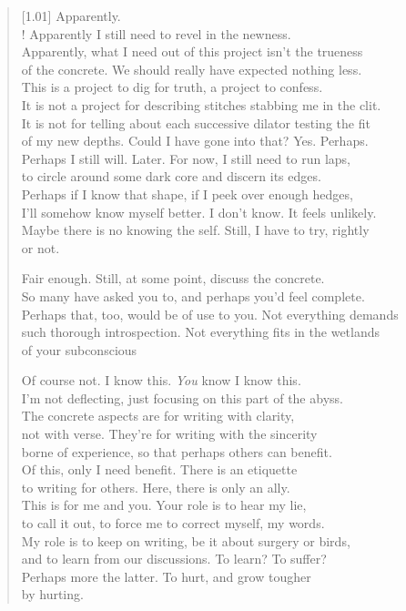 \begin{verse}[1.01\textwidth]
  Apparently.\\!
   Apparently I still need to revel in the newness.\\
  Apparently, what I need out of this project isn't the trueness\\
  of the concrete. We should really have expected nothing less.\\
  This is a project to dig for truth, a project to confess.\\
  It is not a project for describing stitches stabbing me in the clit.\\
  It is not for telling about each successive dilator testing the fit\\
  of my new depths. Could I have gone into that? Yes. Perhaps.\\
  Perhaps I still will. Later. For now, I still need to run laps,\\
  to circle around some dark core and discern its edges.\\
  Perhaps if I know that shape, if I peek over enough hedges,\\
  I'll somehow know myself better. I don't know. It feels unlikely.\\
  Maybe there is no knowing the self. Still, I have to try, rightly\\
  or not.

  \begin{ally}
    \noindent Fair enough. Still, at some point, discuss the concrete.\\
  \noindent So many have asked you to, and perhaps you'd feel complete.\\
  \noindent Perhaps that, too, would be of use to you. Not everything demands\\
  \noindent such thorough introspection. Not everything fits in the wetlands\\
  \noindent of your subconscious
\end{ally}

  Of course not. I know this. \emph{You} know I know this.\\
  I'm not deflecting, just focusing on this part of the abyss.\\
  The concrete aspects are for writing with clarity,\\
  not with verse. They're for writing with the sincerity\\
  borne of experience, so that perhaps others can benefit.\\
  Of this, only I need benefit. There is an etiquette\\
  to writing for others. Here, there is only an ally.\\
  This is for me and you. Your role is to hear my lie,\\
  to call it out, to force me to correct myself, my words.\\
  My role is to keep on writing, be it about surgery or birds,\\
  and to learn from our discussions. To learn? To suffer?\\
  Perhaps more the latter. To hurt, and grow tougher\\
  by hurting.


\end{verse}
